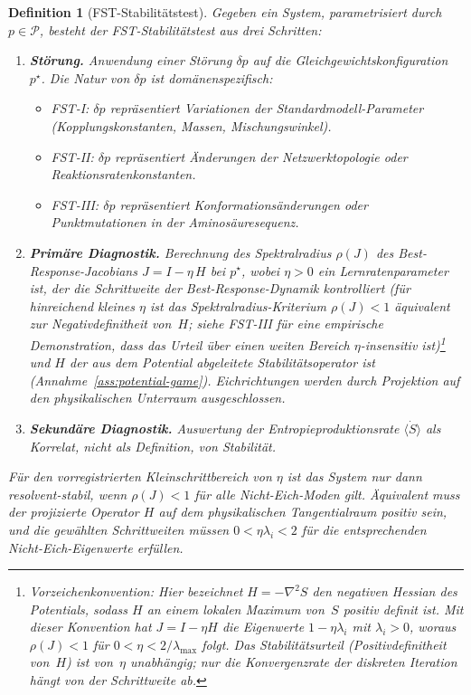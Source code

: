\documentclass[12pt,a4paper]{article}
\newtheorem{definition}{Definition}
\theoremstyle{remark}
\begin{document}
\begin{definition}[FST-Stabilit\"atstest]\label{def:stability-test}
Gegeben ein System, parametrisiert durch $p \in \mathcal{P}$, besteht der
\emph{FST-Stabilit\"atstest} aus drei Schritten:
\begin{enumerate}
  \item \textbf{St\"orung.} Anwendung einer St\"orung $\delta p$ auf die
        Gleichgewichtskonfiguration $p^\star$. Die Natur von $\delta p$
        ist dom\"anenspezifisch:
        \begin{itemize}
          \item FST-I: $\delta p$ repr\"asentiert Variationen der
                Standardmodell-Parameter (Kopplungskonstanten, Massen,
                Mischungswinkel).
          \item FST-II: $\delta p$ repr\"asentiert \"Anderungen der
                Netzwerktopologie oder Reaktionsratenkonstanten.
          \item FST-III: $\delta p$ repr\"asentiert Konformations\"anderungen
                 oder Punktmutationen in der Aminos\"auresequenz.
         \end{itemize}
  \item \textbf{Prim\"are Diagnostik.} Berechnung des Spektralradius
         $\rho(J)$ des Best-Response-Jacobians
         $J = I - \eta\, H$ bei $p^\star$, wobei $\eta > 0$ ein
         Lernratenparameter ist, der die Schrittweite der
         Best-Response-Dynamik kontrolliert (f\"ur hinreichend kleines
         $\eta$ ist das Spektralradius-Kriterium $\rho(J)<1$ \"aquivalent
         zur Negativdefinitheit von~$H$; siehe FST-III f\"ur eine
         empirische Demonstration, dass das Urteil \"uber einen weiten
         Bereich $\eta$-insensitiv ist)\footnote{Vorzeichenkonvention:
         Hier bezeichnet $H = -\nabla^2 S$ den \emph{negativen} Hessian
         des Potentials, sodass $H$ an einem lokalen Maximum von~$S$
         positiv definit ist. Mit dieser Konvention hat
         $J = I - \eta H$ die Eigenwerte $1 - \eta \lambda_i$ mit
         $\lambda_i > 0$, woraus $\rho(J) < 1$ f\"ur
         $0 < \eta < 2/\lambda_{\max}$ folgt. Das Stabilit\"atsurteil
         (Positivdefinitheit von~$H$) ist von~$\eta$ unabh\"angig; nur
         die Konvergenzrate der diskreten Iteration h\"angt von der
         Schrittweite ab.} und $H$ der aus dem Potential abgeleitete
         Stabilit\"atsoperator ist (Annahme~\ref{ass:potential-game}).
         Eichrichtungen werden durch Projektion auf den physikalischen
         Unterraum ausgeschlossen.
  \item \textbf{Sekund\"are Diagnostik.} Auswertung der
         Entropieproduktionsrate $\langle\dot{S}\rangle$ als
         \emph{Korrelat}, nicht als Definition, von Stabilit\"at.
\end{enumerate}
F\"ur den vorregistrierten Kleinschrittbereich von $\eta$ ist das System nur
dann \emph{resolvent-stabil}, wenn $\rho(J) < 1$ f\"ur alle Nicht-Eich-Moden
gilt. \"Aquivalent muss der projizierte Operator $H$ auf dem physikalischen
Tangentialraum positiv sein, und die gew\"ahlten Schrittweiten m\"ussen
$0<\eta\lambda_i<2$ f\"ur die entsprechenden Nicht-Eich-Eigenwerte erf\"ullen.
\end{definition}
\end{document}
